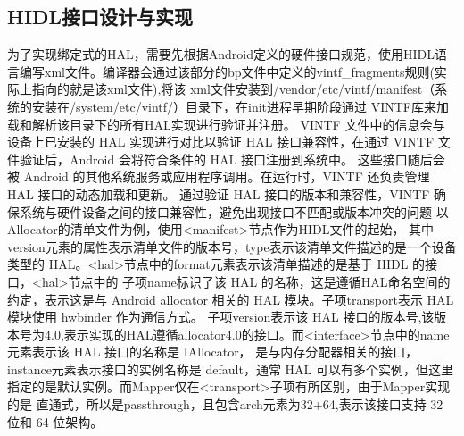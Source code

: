 \subsection{HIDL接口设计与实现}
为了实现绑定式的HAL，需要先根据Android定义的硬件接口规范，使用HIDL语言编写xml文件。编译器会通过该部分的bp文件中定义的vintf\_fragments规则(实际上指向的就是该xml文件),将该
xml文件安装到/vendor/etc/vintf/manifest（系统的安装在/system/etc/vintf/）目录下，在init进程早期阶段通过 VINTF库来加载和解析该目录下的所有HAL实现进行验证并注册。
VINTF 文件中的信息会与设备上已安装的 HAL 实现进行对比以验证 HAL 接口兼容性，在通过 VINTF 文件验证后，Android 会将符合条件的 HAL 接口注册到系统中。
这些接口随后会被 Android 的其他系统服务或应用程序调用。在运行时，VINTF 还负责管理 HAL 接口的动态加载和更新。
通过验证 HAL 接口的版本和兼容性，VINTF 确保系统与硬件设备之间的接口兼容性，避免出现接口不匹配或版本冲突的问题
以Allocator的清单文件为例，使用<manifest>节点作为HIDL文件的起始，
其中version元素的属性表示清单文件的版本号，type表示该清单文件描述的是一个设备类型的 HAL。<hal>节点中的format元素表示该清单描述的是基于 HIDL 的接口，<hal>节点中的
子项name标识了该 HAL 的名称，这是遵循HAL命名空间的约定，表示这是与 Android allocator 相关的 HAL 模块。子项transport表示 HAL 模块使用 hwbinder 作为通信方式。
子项version表示该 HAL 接口的版本号,该版本号为4.0,表示实现的HAL遵循allocator4.0的接口。而<interface>节点中的name元素表示该 HAL 接口的名称是 IAllocator，
是与内存分配器相关的接口，instance元素表示接口的实例名称是 default，通常 HAL 可以有多个实例，但这里指定的是默认实例。而Mapper仅在<transport>子项有所区别，由于Mapper实现的是
直通式，所以是passthrough，且包含arch元素为32+64,表示该接口支持 32 位和 64 位架构。







